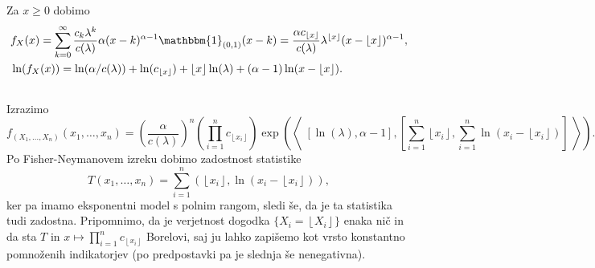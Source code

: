 \documentclass[ letterpaper, titlepage, fleqn]{article}
\newcommand{\adjscalar}[1]{\left\langle\;#1\;\right\rangle}
\newcommand{\ind}{\mathbbm{1}}
\providecommand{\floor}[1]{\left \lfloor #1 \right \rfloor }
\begin{document}
\subsection{}
Za $x\geq0$ dobimo
\begin{equation*}
\begin{aligned}
&f_X(x) = \sum_{k=0}^\infty \frac{c_k\lambda^k}{c(\lambda)}  \alpha (x-k)^{\alpha-1} \ind_{(0,1)}(x-k) 
= \frac{\alpha c_{\floor{x}}}{c(\lambda)} \lambda^{\floor{x}} (x-\floor{x})^{\alpha-1}, \\
&\ln(f_X(x)) = \ln(\alpha/c(\lambda)) + \ln(c_{\floor{x}}) + \floor{x}\ln(\lambda) + (\alpha-1)\ln(x - \floor{x}).
\end{aligned}
\end{equation*}

\subsection{}
Izrazimo
\begin{equation*}
f_{(X_1, \dots, X_n)}(x_1, \dots, x_n) = \left(\frac{\alpha}{c(\lambda)}\right)^n \left(\prod_{i=1}^n c_{\floor{x_i}}\right)
\exp\left(\adjscalar{\left[\ln(\lambda), \alpha-1\right], \left[\sum_{i=1}^n \floor{x_i}, \sum_{i=1}^n \ln(x_i - \floor{x_i})\right]}\right).
\end{equation*}
Po Fisher-Neymanovem izreku dobimo zadostnost statistike 
$$T(x_1, \dots, x_n) = \sum_{i=1}^n (\floor{x_i}, \ln(x_i - \floor{x_i})),$$
ker pa imamo eksponentni model s polnim rangom, sledi še, da je ta statistika tudi zadostna. Pripomnimo, da je verjetnost dogodka $\{X_i = \floor{X_i}\}$ enaka nič in da sta $T$ in $x \mapsto \prod_{i=1}^n c_{\floor{x_i}}$ Borelovi, saj ju lahko zapišemo kot vrsto konstantno pomnoženih indikatorjev (po predpostavki pa je slednja še nenegativna).
\end{document}
